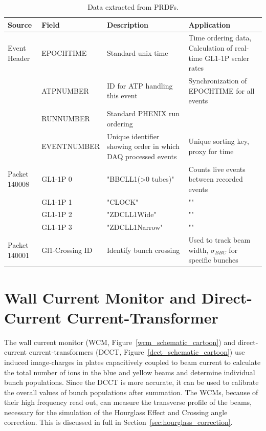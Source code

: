 \begin{table}
\centering
\begin{tabular}{ l l p{6cm} p{8cm} }
\toprule
\textbf{Source} & \textbf{Field} & \textbf{Description} & \textbf{Application} \\
\midrule 
Event Header & EPOCHTIME & Standard unix time & Time ordering data, Calculation of real-time GL1-1P scaler rates \\
 & ATPNUMBER & ID for ATP handling this event & Synchronization of EPOCHTIME for all events \\
 & RUNNUMBER & Standard PHENIX run ordering & \\
 & EVENTNUMBER & Unique identifier showing order in which DAQ processed events & Unique sorting key, proxy for time \\
Packet 140008 & GL1-1P 0 & "BBCLL1(\textgreater0 tubes)" & Counts live events between recorded events \\
 & GL1-1P 1 & "CLOCK" & "" \\
 & GL1-1P 2 & "ZDCLL1Wide" & "" \\
 & GL1-1P 3 & "ZDCLL1Narrow" & "" \\
Packet 140001 & Gl1-Crossing ID & Identify bunch crossing  & Used to track beam width, $\sigma_{BBC}$  for specific bunches\\
\bottomrule
\end{tabular}
\caption{ Data extracted from PRDFs. }
\label{tab:prdf_data_summary}
\end{table}

\section{Wall Current Monitor and Direct-Current Current-Transformer}

The wall current monitor (WCM, Figure~\ref{wcm_schematic_cartoon}) and
direct-current current-transformers (DCCT, Figure~\ref{dcct_schematic_cartoon})
use induced image-charges in plates capacitively coupled to beam current to
calculate the total number of ions in the blue and yellow beams and determine
individual bunch populations. Since the DCCT is more accurate, it can be used to
calibrate the overall values of bunch populations after summation.  The WCMs,
because of their high frequency read out, can measure the transverse profile of
the beams, necessary for the simulation of the Hourglass Effect and Crossing
angle correction. This is discussed in full in
Section~\ref{sec:hourglass_correction}.

